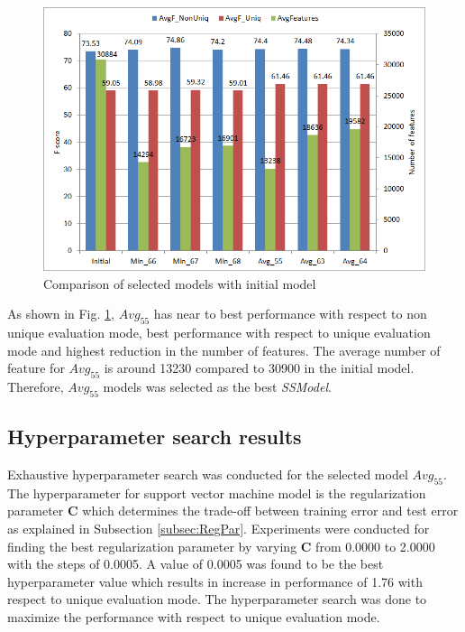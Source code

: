 \begin{figure}
\centering
\includegraphics[scale=0.6]{figures/6ModelsComparison.png}
\caption{Comparison of selected models with initial model}\label{fig:6ModelsComp}
\end{figure}

As shown in Fig. \ref{fig:6ModelsComp}, $Avg_{55}$ has near to best performance with respect to non unique evaluation mode, best performance with respect to unique evaluation mode and highest reduction in the number of features. The average number of feature for $Avg_{55}$ is around 13230 compared to 30900 in the initial model. Therefore, $Avg_{55}$ models was selected as the best \textit{SSModel}.


\subsection{Hyperparameter search results}

Exhaustive hyperparameter search was conducted for the selected model $Avg_{55}$. The hyperparameter for support vector machine model is the regularization parameter $\mathbf{C}$ which determines the trade-off between training error and test error as explained in Subsection \ref{subsec:RegPar}. Experiments were conducted for finding the best regularization parameter by varying $\mathbf{C}$ from 0.0000 to 2.0000 with the steps of 0.0005. A value of 0.0005 was found to be the best hyperparameter value which results in increase in performance of 1.76 with respect to unique evaluation mode. The hyperparameter search was done to  maximize the performance with respect to unique evaluation mode.

